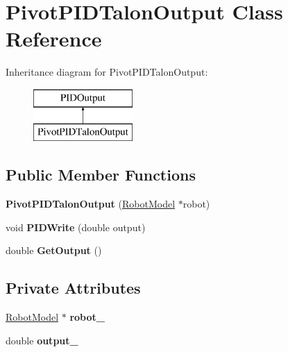 \hypertarget{class_pivot_p_i_d_talon_output}{}\section{Pivot\+P\+I\+D\+Talon\+Output Class Reference}
\label{class_pivot_p_i_d_talon_output}
Inheritance diagram for Pivot\+P\+I\+D\+Talon\+Output\+:\begin{figure}[H]
\begin{center}
\leavevmode
\includegraphics[height=2.000000cm]{class_pivot_p_i_d_talon_output}
\end{center}
\end{figure}
\subsection*{Public Member Functions}
\begin{DoxyCompactItemize}
\item 
\mbox{\label{class_pivot_p_i_d_talon_output_ac7dff318a32bf616f397f6edf642b17e}} 
{\bfseries Pivot\+P\+I\+D\+Talon\+Output} (\hyperlink{class_robot_model}{Robot\+Model} $\ast$robot)
\item 
\mbox{\label{class_pivot_p_i_d_talon_output_a8a2c7a13ef615ad01d00fecc6a16f715}} 
void {\bfseries P\+I\+D\+Write} (double output)
\item 
\mbox{\label{class_pivot_p_i_d_talon_output_a19563bcd7d8afaae782ef167e4a3a973}} 
double {\bfseries Get\+Output} ()
\end{DoxyCompactItemize}
\subsection*{Private Attributes}
\begin{DoxyCompactItemize}
\item 
\mbox{\label{class_pivot_p_i_d_talon_output_a21f494514211fabf65c2615dce434db4}} 
\hyperlink{class_robot_model}{Robot\+Model} $\ast$ {\bfseries robot\+\_\+}
\item 
\mbox{\label{class_pivot_p_i_d_talon_output_a1962bd005ba3a4e0909695a4a321fdf0}} 
double {\bfseries output\+\_\+}
\end{DoxyCompactItemize}


